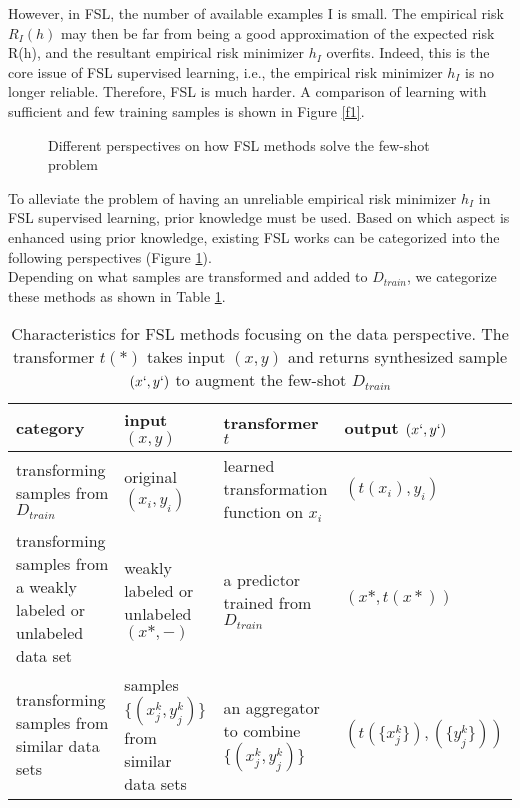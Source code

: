 \documentclass[12pt]{informs4}
\begin{document}
However, in FSL, the number of available examples I is small. The empirical risk $R_I(h)$ may then be far from being a good approximation of the expected risk R(h), and the resultant empirical risk minimizer $h_I$ overfits. Indeed, this is the core issue of FSL supervised learning, i.e., the empirical risk minimizer $h_I$ is no longer reliable. Therefore, FSL is much harder. A comparison of learning with sufficient and few training samples is shown in Figure \ref{f1}.\\
\begin{figure}[H]
\caption{Different perspectives on how FSL methods solve the few-shot problem}
\label{f2}
\end{figure}

To alleviate the problem of having an unreliable empirical risk minimizer $h_I$ in FSL supervised learning, prior knowledge must be used. Based on which aspect is enhanced using prior knowledge, existing FSL works can be categorized into the following perspectives (Figure \ref{f2}).\\

Depending on what samples are transformed and added to $D_{train}$, we categorize these methods as shown in Table \ref{t1}.\\

\begin{table}[H]
\caption{Characteristics for FSL methods focusing on the data perspective. The transformer $t(*)$ takes input $(x, y)$ and returns synthesized sample $(x`, y`)$ to augment the few-shot $D_{train}$}
\begin{tabular}{|p{3cm}|p{3cm}|p{3cm}|p{3cm}|}
\hline
category & input $(x,y)$ & transformer $t$ & output $(x`, y`)$\\
\hline
transforming samples from $D_{train}$ & original $(x_i, y_i)$ & learned transformation function on $x_i$ & $(t(x_i), y_i)$\\
\hline
transforming samples from a weakly labeled or unlabeled data set & weakly labeled or unlabeled $(x*, -)$ &  a predictor trained from $D_{train}$ & $(x*, t(x*))$\\
\hline
transforming samples from similar data sets & samples $\{(x_j^k, y_j^k)\}$ from similar data sets & an aggregator to combine $\{(x_j^k, y_j^k)\}$ & $(t(\{x_j^k\}), (\{y_j^k\}))$\\
\hline
\end{tabular}
\label{t1}
\end{table}
\end{document}
